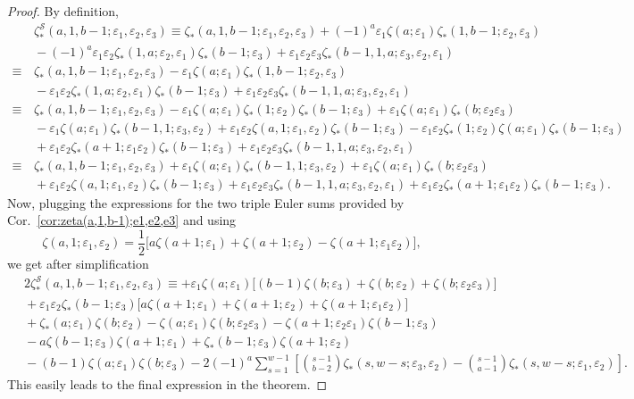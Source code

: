 \documentclass{article}
\newcommand{\Sy}{{\mathcal S}}
\newcommand\eps{{\varepsilon}}
\theoremstyle{plain}
\theoremstyle{definition}
\begin{document}
\begin{proof}
By definition,
\begin{align*}
 &\, \zeta_\ast^\Sy(a,1,b-1;\eps_1,\eps_2,\eps_3)
\equiv \zeta_\ast(a,1,b-1;\eps_1,\eps_2,\eps_3)+(-1)^a \eps_1\zeta(a;\eps_1)\zeta_*(1,b-1;\eps_2,\eps_3)\\
&\,-(-1)^a \eps_1 \eps_2 \zeta_*(1,a;\eps_2,\eps_1)\zeta_*(b-1;\eps_3)
+\eps_1\eps_2\eps_3\zeta_\ast(b-1,1,a;\eps_3,\eps_2,\eps_1)\\
\equiv &\, \zeta_\ast(a,1,b-1;\eps_1,\eps_2,\eps_3)- \eps_1\zeta(a;\eps_1)\zeta_*(1,b-1;\eps_2,\eps_3)\\
&\,-\eps_1\eps_2\zeta_*(1,a;\eps_2,\eps_1)\zeta_*(b-1;\eps_3)+\eps_1\eps_2\eps_3\zeta_\ast(b-1,1,a;\eps_3,\eps_2,\eps_1)\\
\equiv &\, \zeta_\ast(a,1,b-1;\eps_1,\eps_2,\eps_3)-\eps_1\zeta(a;\eps_1)\zeta_*(1;\eps_2)\zeta_*(b-1;\eps_3)
+\eps_1\zeta(a;\eps_1)\zeta_*(b;\eps_2\eps_3)\\
&\,-\eps_1\zeta(a;\eps_1)\zeta_*(b-1,1;\eps_3,\eps_2)+\eps_1 \eps_2 \zeta(a,1;\eps_1,\eps_2)\zeta_*(b-1;\eps_3)- \eps_1 \eps_2 \zeta_*(1;\eps_2)\zeta(a;\eps_1)\zeta_*(b-1;\eps_3)\\
&\, +\eps_1 \eps_2 \zeta_*(a+1;\eps_1\eps_2)\zeta_*(b-1;\eps_3)
+\eps_1\eps_2\eps_3\zeta_\ast(b-1,1,a;\eps_3,\eps_2,\eps_1)\\
\equiv &\, \zeta_\ast(a,1,b-1;\eps_1,\eps_2,\eps_3)+\eps_1\zeta(a;\eps_1)\zeta_*(b-1,1;\eps_3,\eps_2)
+\eps_1\zeta(a;\eps_1)\zeta_*(b;\eps_2\eps_3)\\
&\,+\eps_1 \eps_2 \zeta(a,1;\eps_1,\eps_2)\zeta_*(b-1;\eps_3)
+\eps_1\eps_2\eps_3\zeta_\ast(b-1,1,a;\eps_3,\eps_2,\eps_1)
+\eps_1 \eps_2 \zeta_*(a+1;\eps_1\eps_2)\zeta_*(b-1;\eps_3).
\end{align*}
Now, plugging the expressions for the two triple Euler sums provided by Cor.~\ref{cor:zeta(a,1,b-1);e1,e2,e3} and using
\begin{equation*}
\zeta(a,1;\eps_1,\eps_2)=\frac12\Big[a\zeta(a+1; \eps_1)+\zeta(a+1; \eps_2)-\zeta(a+1; \eps_1\eps_2)\Big],
\end{equation*}
we get after simplification
 \begin{align*}
 &\, 2\zeta_\ast^\Sy(a,1,b-1;\eps_1,\eps_2,\eps_3)
\equiv
+ \eps_1 \zeta(a;\eps_1)\Big[(b-1)\zeta(b; \eps_3)+\zeta(b;\eps_2)+\zeta(b;\eps_2\eps_3)\Big]\\
&\,+ \eps_1 \eps_2  \zeta_*(b-1;\eps_3)\Big[a\zeta(a+1; \eps_1)+\zeta(a+1; \eps_2)+\zeta(a+1; \eps_1\eps_2)\Big]\\
&\, +\zeta_*(a;\eps_1)\zeta(b; \eps_2)-\zeta(a;\eps_1)\zeta(b;\eps_2\eps_3)-\zeta(a+1;\eps_2\eps_1)\zeta(b-1;\eps_3)\\
&\, -a\zeta(b-1;\eps_3) \zeta(a+1;\eps_1)+\zeta_*(b-1;\eps_3)\zeta(a+1; \eps_2)\\
&\, -(b-1) \zeta(a;\eps_1) \zeta(b;\eps_3)
  -2(-1)^{a}\sum_{s=1}^{w-1}\left[ \binom{s-1}{b-2} \zeta_*(s,w-s;\eps_3,\eps_2) -\binom{s-1}{a-1}\zeta_*(s,w-s;\eps_1,\eps_2)\right].
\end{align*}
This easily leads to the final expression in the theorem.
\end{proof}
\end{document}
